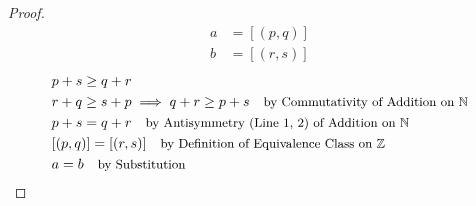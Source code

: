 \documentclass[12pt]{article}
\newcommand{\stext}[1]{\quad\text{\small #1}}
\theoremstyle{definition}
\begin{document}
\begin{proof}
    \begin{align*}
        a &= [(p, q)] \\ 
        b &= [(r, s)]
    \end{align*}
    \begin{align*}
        & p + s \geq q + r \\
        & r + q \geq s + p \implies q + r \geq p + s \stext{by Commutativity of Addition on $\mathbb{N}$}\\ 
        & p + s = q + r \stext{by Antisymmetry (Line 1, 2) of Addition on $\mathbb{N}$ }\\
        & [(p, q)] = [(r, s)] \stext{by Definition of Equivalence Class on $\mathbb{Z}$}\\ 
        & a = b \stext{by Substitution}
    \end{align*}
\end{proof}
\end{document}
